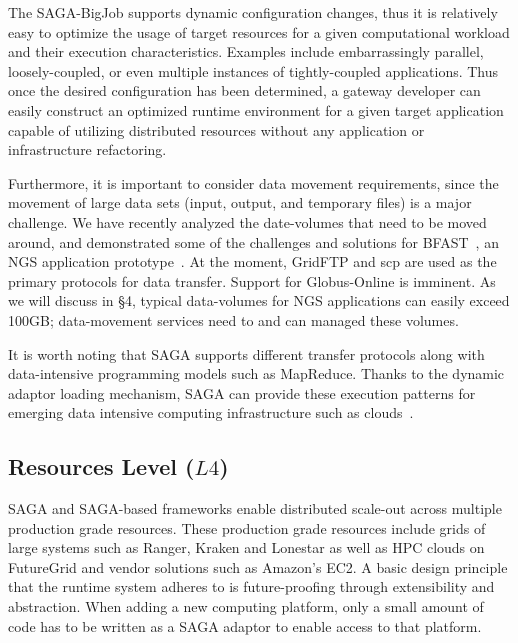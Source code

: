 \documentclass[]{svjour3}
\begin{document}
The SAGA-BigJob supports dynamic configuration changes, thus it is
relatively easy to optimize the usage of target resources for a given
computational workload and their execution characteristics. Examples include
embarrassingly parallel, loosely-coupled, or even multiple instances of
tightly-coupled applications. Thus once the desired configuration has
been determined, a gateway developer can easily construct an optimized
runtime environment for a given target application capable of
utilizing distributed resources without any application or
infrastructure refactoring.

Furthermore, it is important to consider data movement requirements,
since the movement of large data sets (input, output, and temporary
files) is a major challenge. We have recently analyzed the
date-volumes that need to be moved around, and demonstrated some of
the challenges and solutions for BFAST~\cite{dare-ecmls11}, an NGS
application prototype~. At the moment,
GridFTP and scp are used as the primary protocols for data
transfer. Support for Globus-Online is imminent. As we will discuss in
\S4, typical data-volumes for NGS applications can easily exceed
100GB; data-movement services need to and can managed these
volumes.~

It is worth noting that SAGA supports different transfer protocols
along with data-intensive programming models such as MapReduce.
Thanks to the dynamic adaptor loading mechanism, SAGA can provide
these execution patterns for emerging data intensive computing
infrastructure such as clouds~\cite{bigjob_cloudcom10,saga_bigjob_condor_cloud}.

\subsection{Resources Level ($L4$)} 

SAGA and SAGA-based frameworks enable distributed scale-out across
multiple production grade resources. These production grade resources
include grids of large systems such as Ranger, Kraken and Lonestar as
well as HPC clouds on FutureGrid and vendor solutions such as Amazon's
EC2. A basic design principle that the runtime system adheres to is
future-proofing through extensibility and abstraction. When adding a
new computing platform, only a small amount of code has to be written
as a SAGA adaptor to enable access to that platform.
\end{document}
